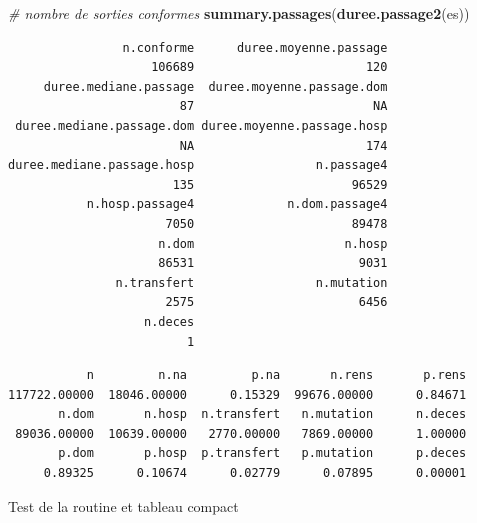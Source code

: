 \documentclass[]{article}
\newenvironment{Shaded}{\begin{snugshade}}{\end{snugshade}}
\newcommand{\KeywordTok}[1]{\textcolor[rgb]{0.13,0.29,0.53}{\textbf{{#1}}}}
\newcommand{\CommentTok}[1]{\textcolor[rgb]{0.56,0.35,0.01}{\textit{{#1}}}}
\newcommand{\NormalTok}[1]{{#1}}
\begin{document}
\begin{Shaded}
\begin{Highlighting}[]
\CommentTok{# nombre de sorties conformes}
\KeywordTok{summary.passages}\NormalTok{(}\KeywordTok{duree.passage2}\NormalTok{(es))}
\end{Highlighting}
\end{Shaded}

\begin{verbatim}
                n.conforme      duree.moyenne.passage 
                    106689                        120 
     duree.mediane.passage  duree.moyenne.passage.dom 
                        87                         NA 
 duree.mediane.passage.dom duree.moyenne.passage.hosp 
                        NA                        174 
duree.mediane.passage.hosp                 n.passage4 
                       135                      96529 
           n.hosp.passage4             n.dom.passage4 
                      7050                      89478 
                     n.dom                     n.hosp 
                     86531                       9031 
               n.transfert                 n.mutation 
                      2575                       6456 
                   n.deces 
                         1 
\end{verbatim}

\begin{Shaded}
\end{Shaded}

\begin{verbatim}
           n         n.na         p.na       n.rens       p.rens 
117722.00000  18046.00000      0.15329  99676.00000      0.84671 
       n.dom       n.hosp  n.transfert   n.mutation      n.deces 
 89036.00000  10639.00000   2770.00000   7869.00000      1.00000 
       p.dom       p.hosp  p.transfert   p.mutation      p.deces 
     0.89325      0.10674      0.02779      0.07895      0.00001 
\end{verbatim}

Test de la routine et tableau compact
\end{document}
